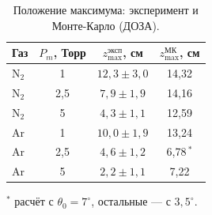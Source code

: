 \documentclass[12pt,a4paper]{article}
\newcommand{\Nt}{\mathrm{N_2}}
\begin{document}
\begin{enumerate}
        \begin{table}[H]
          \centering
          \caption{Положение максимума: эксперимент и Монте-Карло (ДОЗА).}
          \label{tab:mc_cmp}
          \begin{tabular}{lccc}
            \toprule
            Газ & $P_m$, Торр & $z_\text{max}^\text{эксп}$, см &
            $z_\text{max}^\text{МК}$, см \\
            \midrule
            $\Nt$ & 1   & $12{,}3\pm3{,}0$ & 14,32 \\
            $\Nt$ & 2,5 & $7{,}9\pm1{,}9$  & 14,16 \\
            $\Nt$ & 5   & $4{,}3\pm1{,}1$  & 12,59 \\
            Ar    & 1   & $10{,}0\pm1{,}9$ & 13,24 \\
            Ar    & 2,5 & $4{,}6\pm1{,}2$  & 6,78\,$^{*}$ \\
            Ar    & 5   & $2{,}2\pm1{,}1$  & 7,22 \\
            \bottomrule
          \end{tabular}

          \smallskip
          {\footnotesize $^{*}$ расчёт с $\theta_0 = 7^\circ$, остальные
          --- с $3{,}5^\circ$.}
        \end{table}


\end{enumerate}
\end{document}
